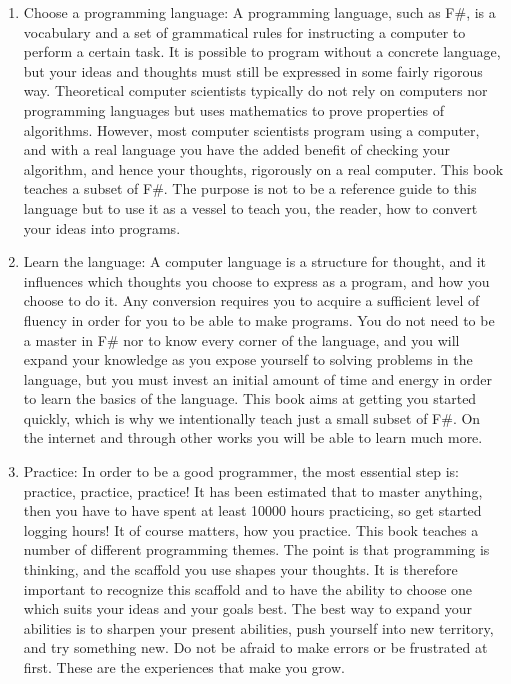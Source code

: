\begin{enumerate}
\item Choose a programming language: A programming language, such as F\#, is a vocabulary and a set of grammatical rules for instructing a computer to perform a certain task. It is possible to program without a concrete language, but your ideas and thoughts must still be expressed in some fairly rigorous way. Theoretical computer scientists typically do not rely on computers nor programming languages but uses mathematics to prove properties of algorithms. However, most computer scientists program using a computer, and with a real language you have the added benefit of checking your algorithm, and hence your thoughts, rigorously on a real computer. This book teaches a subset of F\#. The purpose is not to be a reference guide to this language but to use it as a vessel to teach you, the reader, how to convert your ideas into programs.
\item Learn the language: A computer language is a structure for thought, and it influences which thoughts you choose to express as a program, and how you choose to do it. Any conversion requires you to acquire a sufficient level of fluency in order for you to be able to make programs. You do not need to be a master in F\# nor to know every corner of the language, and you will expand your knowledge as you expose yourself to solving problems in the language, but you must invest an initial amount of time and energy in order to learn the basics of the language. This book aims at getting you started quickly, which is why we intentionally teach just a small subset of F\#. On the internet and through other works you will be able to learn much more.
\item Practice: In order to be a good programmer, the most essential step is: practice, practice, practice! It has been estimated that to master anything, then you have to have spent at least 10000 hours practicing, so get started logging hours! It of course matters, how you practice. This book teaches a number of different programming themes. The point is that programming is thinking, and the scaffold you use shapes your thoughts. It is therefore important to recognize this scaffold and to have the ability to choose one which suits your ideas and your goals best. The best way to expand your abilities is to sharpen your present abilities, push yourself into new territory, and try something new. Do not be afraid to make errors or be frustrated at first. These are the experiences that make you grow.

\end{enumerate}
